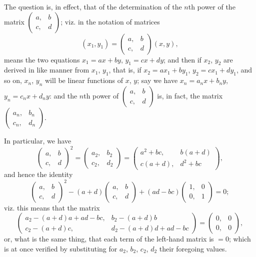 \documentclass[11pt,a4paper]{book}
\begin{document}
The question is, in effect, that of the determination of the $n$th power of the
matrix $\left(\begin{array}{c|c} a, & b \\ \hline c, & d \end{array}\right)$; viz. in the notation of matrices
%
\[
(x_1, y_1) = \left(\begin{array}{c|c} a, & b \\ \hline c, & d \end{array}\right) (x, y),
\]
%
means the two equations $x_1 = ax + by$, $y_1 = cx + dy$; and then if $x_2$, $y_2$ are derived in
like manner from $x_1$, $y_1$, that is, if $x_2 = ax_1 + by_1$, $y_2 = cx_1 + dy_1$, and so on,
$x_n$, $y_n$ will be linear functions of $x$, $y$; say we have $x_n = a_n x + b_n y$,
$y_n = c_n x + d_n y$: and the $n$th power of $\left(\begin{array}{c|c} a, & b \\ \hline c, & d \end{array}\right)$
is, in fact, the matrix $\left(\begin{array}{c|c} a_n, & b_n \\ \hline c_n, & d_n \end{array}\right)$.

In particular, we have
%
\[
\left(\begin{array}{c|c} a, & b \\ \hline c, & d \end{array}\right)^{\!2}
= \left(\begin{array}{c|c} a_2, & b_2 \\ \hline c_2, & d_2 \end{array}\right)
= \left(\begin{array}{c|c} a^2+bc, & b(a+d) \\ \hline c(a+d), & d^2+bc \end{array}\right),
\]
%
and hence the identity
%
\[
\left(\begin{array}{c|c} a, & b \\ \hline c, & d \end{array}\right)^{\!2}
- (a+d) \left(\begin{array}{c|c} a, & b \\ \hline c, & d \end{array}\right)
+ (ad-bc) \left(\begin{array}{c|c} 1, & 0 \\ \hline 0, & 1 \end{array}\right) = 0;
\]
%
viz. this means that the matrix
%
\[
\left(\begin{array}{c|c}
a_2 - (a+d)a + ad-bc, & b_2 - (a+d)b \\[4pt]
c_2 - (a+d)c, & d_2 - (a+d)d + ad-bc
\end{array}\right)
= \left(\begin{array}{c|c} 0, & 0 \\ \hline 0, & 0 \end{array}\right),
\]
%
or, what is the same thing, that each term of the left-hand matrix is $=0$; which is
at once verified by substituting for $a_2$, $b_2$, $c_2$, $d_2$ their foregoing values.
\end{document}
